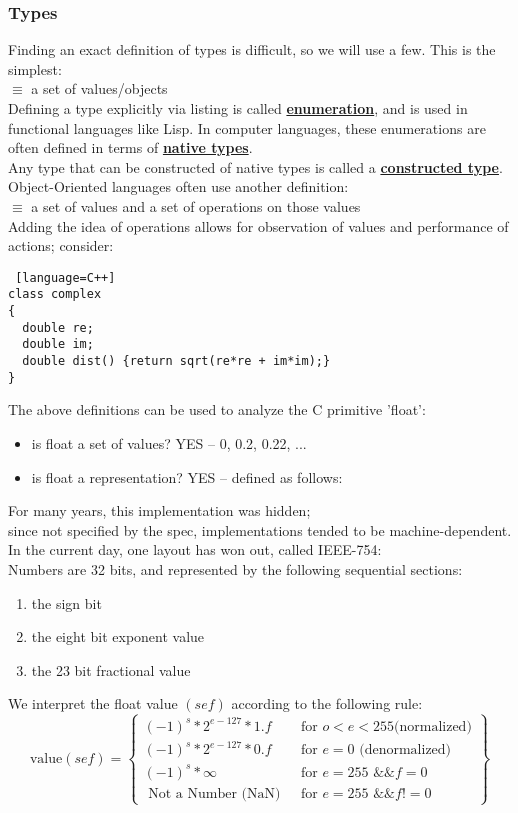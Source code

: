 \documentclass[../../lecture_notes.tex]{subfiles}
\begin{document}
\subsubsection*{Types}
Finding an exact definition of types is difficult, so we will use a few.  This is the simplest:\\
\indent $\equiv$ a set of values/objects\\
Defining a type explicitly via listing is called \textbf{\underline{enumeration}},
	and is used in functional languages like Lisp.
In computer languages, these enumerations are often defined in terms of \textbf{\underline{native types}}.\\
Any type that can be constructed of native types is called a \textbf{\underline{constructed type}}.
\\
Object-Oriented languages often use another definition:\\
\indent $\equiv$ a set of values and a set of operations on those values\\
Adding the idea of operations allows for observation of values and performance of actions; consider:
\begin{lstlisting} [language=C++]
class complex 
{
  double re;
  double im;
  double dist() {return sqrt(re*re + im*im);}
}
\end{lstlisting}
The above definitions can be used to analyze the C primitive 'float':
\begin{itemize} [itemsep=0mm]
	\item is float a set of values? YES -- {0, 0.2, 0.22, ...}
	\item is float a representation? YES -- defined as follows:
\end{itemize} 
For many years, this implementation was hidden;\\
	since not specified by the spec, implementations tended to be machine-dependent.\\
In the current day, one layout has won out, called IEEE-754:\\
\indent Numbers are 32 bits, and represented by the following sequential sections:
	\begin{enumerate} [itemsep=0mm]
		\item the sign bit
		\item the eight bit exponent value
		\item the 23 bit fractional value
	\end{enumerate}
We interpret the float value $(sef)$ according to the following rule:
	\begin{equation*}
		\text{value}(sef) = \left\{ \begin{array} {lr}
				(-1)^s * 2^{e - 127} * 1.f & \text{ for } o < e < 255 \text{(normalized)}\\
				(-1)^s * 2^{e - 127} * 0.f & \text{ for } e = 0 \text{ (denormalized)}\\
				(-1)^s * \infty & \text{ for } e=255 \text{ \&\& } f = 0\\
				\text{ Not a Number (NaN) } & \text{ for } e = 255 \text{ \&\& } f != 0
			\end{array} \right\}
	\end{equation*}
\end{document}
